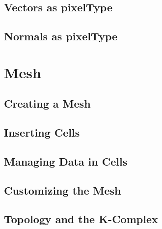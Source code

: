 




\subsection{Vectors as pixelType}
\label{sec:PointSetWithVectorsAsPixelType}





\subsection{Normals as pixelType}
\label{sec:PointSetWithCovariantVectorsAsPixelType}






\section{Mesh}\label{MeshSection}

\subsection{Creating a Mesh}
\label{sec:CreatingAMesh}




\subsection{Inserting Cells}
\label{sec:InsertingCellsInMesh}




\subsection{Managing Data in Cells}
\label{sec:ManagingCellDataInMesh}




\subsection{Customizing the Mesh}
\label{sec:CustomizingTheMesh}




\subsection{Topology and the K-Complex}
\label{sec:MeshKComplex}

